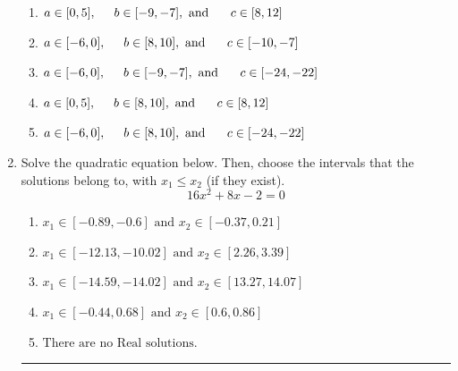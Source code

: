\documentclass[14pt]{extbook}
\newcommand{\litem}[1]{\item#1\hspace*{-1cm}\rule{\textwidth}{0.4pt}}
\begin{document}
\begin{enumerate}
{\begin{center}
\end{center}
\begin{enumerate}[label=\Alph*.]
\item \( a \in [0, 5], \hspace*{5mm} b \in [-9, -7], \text{ and } \hspace*{5mm} c \in [8, 12] \)
\item \( a \in [-6, 0], \hspace*{5mm} b \in [8, 10], \text{ and } \hspace*{5mm} c \in [-10, -7] \)
\item \( a \in [-6, 0], \hspace*{5mm} b \in [-9, -7], \text{ and } \hspace*{5mm} c \in [-24, -22] \)
\item \( a \in [0, 5], \hspace*{5mm} b \in [8, 10], \text{ and } \hspace*{5mm} c \in [8, 12] \)
\item \( a \in [-6, 0], \hspace*{5mm} b \in [8, 10], \text{ and } \hspace*{5mm} c \in [-24, -22] \)

\end{enumerate} }
\litem{
Solve the quadratic equation below. Then, choose the intervals that the solutions belong to, with $x_1 \leq x_2$ (if they exist).\[ 16x^{2} +8 x -2 = 0 \]\begin{enumerate}[label=\Alph*.]
\item \( x_1 \in [-0.89, -0.6] \text{ and } x_2 \in [-0.37, 0.21] \)
\item \( x_1 \in [-12.13, -10.02] \text{ and } x_2 \in [2.26, 3.39] \)
\item \( x_1 \in [-14.59, -14.02] \text{ and } x_2 \in [13.27, 14.07] \)
\item \( x_1 \in [-0.44, 0.68] \text{ and } x_2 \in [0.6, 0.86] \)
\item \( \text{There are no Real solutions.} \)


\end{enumerate}}
\end{enumerate}
\end{document}
